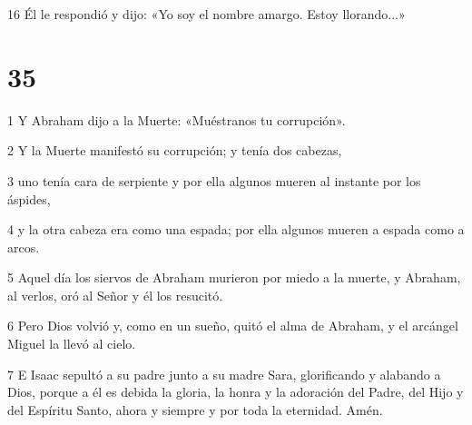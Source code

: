 \par 16 Él le respondió y dijo: «Yo soy el nombre amargo. Estoy llorando...»

\chapter{35}

\par 1 Y Abraham dijo a la Muerte: «Muéstranos tu corrupción».

\par 2 Y la Muerte manifestó su corrupción; y tenía dos cabezas,

\par 3 uno tenía cara de serpiente y por ella algunos mueren al instante por los áspides,

\par 4 y la otra cabeza era como una espada; por ella algunos mueren a espada como a arcos.

\par 5 Aquel día los siervos de Abraham murieron por miedo a la muerte, y Abraham, al verlos, oró al Señor y él los resucitó.

\par 6 Pero Dios volvió y, como en un sueño, quitó el alma de Abraham, y el arcángel Miguel la llevó al cielo.

\par 7 E Isaac sepultó a su padre junto a su madre Sara, glorificando y alabando a Dios, porque a él es debida la gloria, la honra y la adoración del Padre, del Hijo y del Espíritu Santo, ahora y siempre y por toda la eternidad. Amén.

